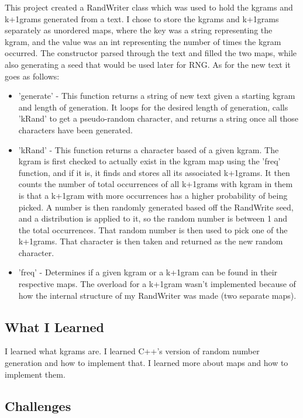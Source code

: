 This project created a RandWriter class which was used to hold the kgrams and k+1grams generated from a text. 
I chose to store the kgrams and k+1grams separately as unordered maps, where the key was a string representing the kgram, and the value was an int representing the number of times the kgram occurred.
The constructor parsed through the text and filled the two maps, while also generating a seed that would be used later for RNG.
As for the new text it goes as follows:
\begin{itemize}
\item 'generate' - This function returns a string of new text given a starting kgram and length of generation.
It loops for the desired length of generation, calls 'kRand' to get a pseudo-random character, and returns a string once all those characters have been generated.
\item 'kRand' - This function returns a character based of a given kgram.
The kgram is first checked to actually exist in the kgram map using the 'freq' function, and if it is, it finds and stores all its associated k+1grams.
It then counts the number of total occurrences of all k+1grams with kgram in them is that a k+1gram with more occurrences has a higher probability of being picked.
A number is then randomly generated based off the RandWrite seed, and a distribution is applied to it, so the random number is between 1 and the total occurrences. 
That random number is then used to pick one of the k+1grams.
That character is then taken and returned as the new random character.
\item 'freq' - Determines if a given kgram or a k+1gram can be found in their respective maps.
The overload for a k+1gram wasn't implemented because of how the internal structure of my RandWriter was made (two separate maps).
\end{itemize}

\subsection{What I Learned}\label{sec:ps6:learned} %

I learned what kgrams are.
I learned C++'s version of random number generation and how to implement that.
I learned more about maps and how to implement them.

\subsection{Challenges}\label{sec:ps6:challenges} %


